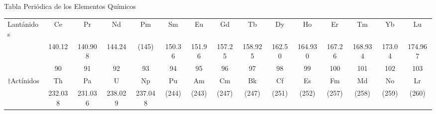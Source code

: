 \begin{infocard}{Tabla Periódica de los Elementos Químicos}
\begin{tabular}{|p{3.5cm}|*{14}{c|}}
        \sc *Lantánidos        & Ce             & Pr             & Nd             & Pm             & Sm            & Eu            & Gd            & Tb             & Dy            & Ho             & Er            & Tm             & Yb            & Lu             \\[-2mm]
                               & \small 140.12  & \small 140.908 & \small 144.24  & \small (145)   & \small 150.36 & \small 151.96 & \small 157.25 & \small 158.925 & \small 162.50 & \small 164.930 & \small 167.26 & \small 168.934 & \small 173.04 & \small 174.967 \\[-1mm]
        \hline
                               & \small 90      & \small 91      & \small 92      & \small 93      & \small 94     & \small 95     & \small 96     & \small 97      & \small 98     & \small 99      & \small 100    & \small 101     & \small 102    & \small 103     \\[-1mm]
        \sc $\dagger$Actínidos & Th             & Pa             & U              & Np             & Pu            & Am            & Cm            & Bk             & Cf            & Es             & Fm            & Md             & No            & Lr             \\[-2mm]
                               & \small 232.038 & \small 231.036 & \small 238.029 & \small 237.048 & \small (244)  & \small (243)  & \small (247)  & \small (247)   & \small (251)  & \small (252)   & \small (257)  & \small (258)   & \small (259)  & \small (260)   \\
        \hline
    \end{tabular}
\end{infocard}